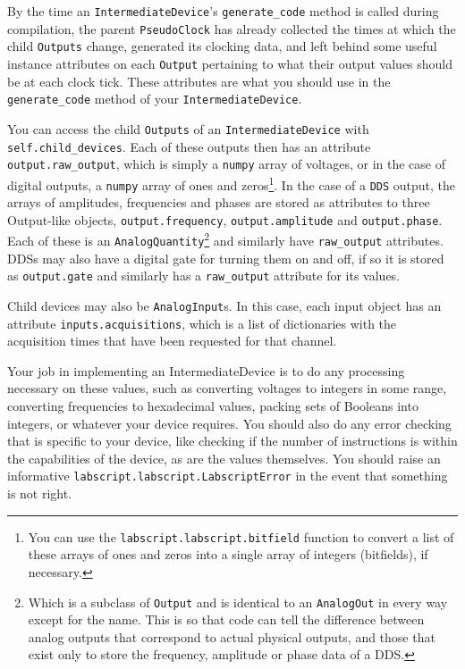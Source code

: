 \documentclass[a4paper,11pt,titlepage]{article}
\begin{document}
By the time an \texttt{IntermediateDevice}'s \texttt{generate\_code} method is called during compilation, the parent \texttt{PseudoClock} has already collected the times at which the child \texttt{Outputs} change, generated its clocking data, and left behind some useful instance attributes on each \texttt{Output} pertaining to what their output values should be at each clock tick. These attributes are what you should use in the \texttt{generate\_code} method of your \texttt{IntermediateDevice}.

You can access the child \texttt{Outputs} of an \texttt{IntermediateDevice} with \texttt{self.child\_devices}. Each of these outputs then has an attribute \texttt{output.raw\_output}, which is simply a \texttt{numpy} array of voltages, or in the case of digital outputs, a \texttt{numpy} array of ones and zeros\footnote{You can use the \texttt{labscript.labscript.bitfield} function to convert a list of these arrays of ones and zeros into a single array of integers (bitfields), if necessary.}. In the case of a \texttt{DDS} output, the arrays of amplitudes, frequencies and phases are stored as attributes to three Output-like objects, \texttt{output.frequency}, \texttt{output.amplitude} and \texttt{output.phase}. Each of these is an \texttt{AnalogQuantity}\footnote{Which is a subclass of \texttt{Output} and is identical to an \texttt{AnalogOut} in every way except for the name. This is so that code can tell the difference between analog outputs that correspond to actual physical outputs, and those that exist only to store the frequency, amplitude or phase data of a DDS.} and similarly have \texttt{raw\_output} attributes. DDSs may also have a digital gate for turning them on and off, if so it is stored as \texttt{output.gate} and similarly has a \texttt{raw\_output} attribute for its values.

Child devices may also be \texttt{AnalogInput}s. In this case, each input object has an attribute \texttt{inputs.acquisitions}, which is a list of dictionaries with the acquisition times that have been requested for that channel.


Your job in implementing an IntermediateDevice is to do any processing necessary on these values, such as converting voltages to integers in some range, converting frequencies to hexadecimal values, packing sets of Booleans into integers, or whatever your device requires. You should also do any error checking that is specific to your device, like checking if the number of instructions is within the capabilities of the device, as are the values themselves. You should raise an informative \texttt{labscript.labscript.LabscriptError} in the event that something is not right.
 
\end{document}
